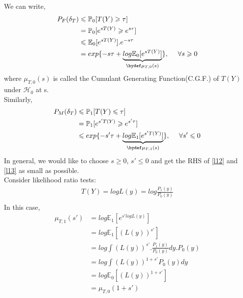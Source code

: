 \documentclass[12pt]{report}
\begin{document}
\noindent We can write,\\
\begin{equation}
\label{l12}
\begin{aligned}
P_F(\delta_T) & \leqslant \mathbb{P}_0[T(Y)\geqslant\tau]\\
&=	\mathbb{P}_0[e^{sT(Y)}\geqslant e^{s\tau}]\\	 	 &\leqslant \mathbb{E}_0[e^{sT(Y)}].e^{-s\tau}\\
&= exp\lbrace-s\tau + \underbrace{log{\mathbb{E}_0[e^{sT(Y)}]}}_{\bydef \mu_{T,0}(s)} \rbrace, \ \ \ \ \forall s\geqslant0 \\
\end{aligned} 	
\end{equation}
where $\mu_{T,0}(s)$ is called the Cumulant Generating Function(C.G.F.) of $T(Y)$ under $\mathcal{H}_0$ at s.\\
Similarly,
\begin{equation}
\label{l13}
\begin{aligned}
P_M(\delta_T) & \leqslant \mathbb{P}_1[T(Y)\leqslant\tau]\\
&=	\mathbb{P}_1[e^{s'T(Y)}\geqslant e^{s'\tau}]\\	 	 &\leqslant exp\lbrace-s'\tau + \underbrace{log{\mathbb{E}_1[e^{s'T(Y)}]}}_{\bydef \mu_{T,1}(s)} \rbrace, \ \ \ \ \forall s'\leqslant0 \\
\end{aligned}
\end{equation}
In general, we would like to choose $s \geqslant 0$, $s' \leqslant 0$ and get the RHS of \eqref{l12} and \eqref{l13} as small as possible.\\
Consider likelihood ratio tests:
\begin{equation}
\begin{aligned}
T(Y)=logL(y)=log\frac{P_1(y)}{P_0(y)}\\
\end{aligned}
\end{equation}
In this case,
\begin{equation}
\begin{aligned}
\mu_{T,1}(s') &= log\mathbb{E}_1[e^{s'logL(y)}]\\
&=log{\mathbb{E}_1[(L(y))^{s'}]}\\
&=log\int (L(y))^{s'}. \frac{P_1(y)}{P_0(y)} dy. P_0(y)\\
&=log\int (L(y))^{1+s'}   P_0(y) dy \\
&=log\mathbb{E}_0 [(L(y))^{1+s'}] \\
&=\mu_{T,0}(1+s')\\
\end{aligned}
\end{equation}\\
\end{document}
